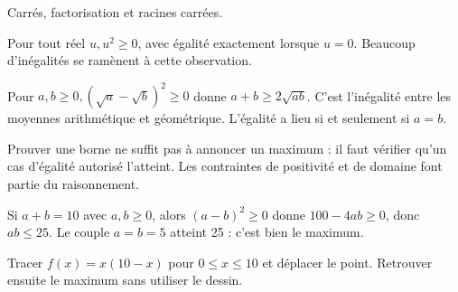 \documentclass[11pt]{article}
\begin{document}
Carrés, factorisation et racines carrées.\par
{}
Pour tout réel \(u, u^{2}\geq 0\), avec égalité exactement lorsque \(u=0\). Beaucoup d’inégalités se ramènent à cette observation.\par
Pour \(a,b\geq 0, (\sqrt{a}-\sqrt{b})^{2}\geq 0\) donne \(a+b\geq 2\sqrt{ab}\). C’est l’inégalité entre les moyennes arithmétique et géométrique. L’égalité a lieu si et seulement si \(a=b\).\par
Prouver une borne ne suffit pas à annoncer un maximum : il faut vérifier qu’un cas d’égalité autorisé l’atteint. Les contraintes de positivité et de domaine font partie du raisonnement.\par
{}
Si \(a+b=10\) avec \(a,b\geq 0\), alors \((a-b)^{2}\geq 0\) donne \(100-4ab\geq 0\), donc \(ab\leq 25\). Le couple \(a=b=5\) atteint 25 : c’est bien le maximum.\par
{}
Tracer \(f(x)=x(10-x)\) pour \(0\leq x\leq 10\) et déplacer le point. Retrouver ensuite le maximum sans utiliser le dessin.\par
\end{document}
